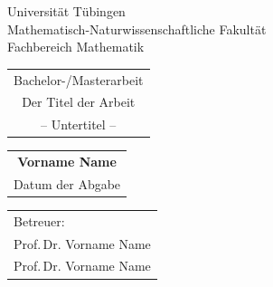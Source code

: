 
\begin{titlepage}
\parbox{.75\linewidth}{%
Universität Tübingen \\ 
Mathematisch-Naturwissenschaftliche Fakultät \\ 
Fachbereich Mathematik} 
\par\vspace{3cm}
\begin{center}\Large\bfseries
	\begin{tabular}{c}
		Bachelor-/Masterarbeit \\[1cm]
		Der Titel der Arbeit \\
		-- Untertitel --
	\end{tabular}%
	\par\normalsize\normalfont\vspace*{2cm}%
	\begin{tabular}{c}
		\large\textbf{Vorname Name} \\[20pt]
		Datum der Abgabe		%
	\end{tabular}\par\vspace*{\fill}
	\begin{tabular}[t]{l}
	Betreuer: \\[1ex]
	Prof.\,Dr. Vorname Name \\
	Prof.\,Dr. Vorname Name		
	\end{tabular}
\end{center}
\end{titlepage}
\cleardoublepage